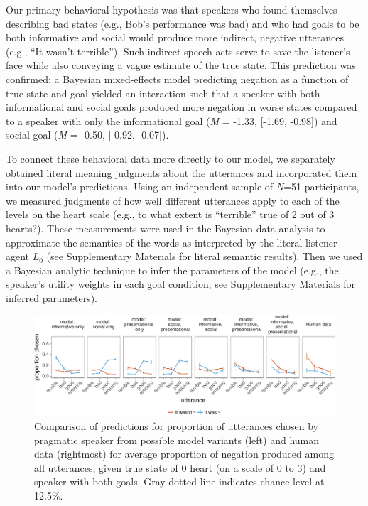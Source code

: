 \documentclass[12pt]{article}
\begin{document}
Our primary behavioral hypothesis was that speakers who found themselves
describing bad states (e.g., Bob's performance was bad) and who had
goals to be both informative and social would produce more indirect,
negative utterances (e.g., \enquote{It wasn't terrible}). Such indirect
speech acts serve to save the listener's face while also conveying a
vague estimate of the true state. This prediction was confirmed: a
Bayesian mixed-effects model predicting negation as a function of true
state and goal yielded an interaction such that a speaker with both
informational and social goals produced more negation in worse states
compared to a speaker with only the informational goal (\emph{M} =
-1.33, {[}-1.69, -0.98{]}) and social goal (\emph{M} = -0.50, {[}-0.92,
-0.07{]}).

To connect these behavioral data more directly to our model, we
separately obtained literal meaning judgments about the utterances and
incorporated them into our model's predictions. Using an independent
sample of \emph{N}=51 participants, we measured judgments of how well
different utterances apply to each of the levels on the heart scale
(e.g., to what extent is \enquote{terrible} true of 2 out of 3 hearts?).
These measurements were used in the Bayesian data analysis to
approximate the semantics of the words as interpreted by the literal
listener agent \(L_0\) (see Supplementary Materials for literal semantic
results). Then we used a Bayesian analytic technique \cite{lee2014} 
to infer the parameters of the model (e.g., the
speaker's utility weights in each goal condition; see Supplementary
Materials for inferred parameters).

\begin{figure}
\centering
\includegraphics[width=\textwidth]{polite_manuscript_files/figure-latex/comparison-1.pdf}
\caption{\label{fig:comparison}Comparison of predictions for proportion of
utterances chosen by pragmatic speaker from possible model variants
(left) and human data (rightmost) for average proportion of negation
produced among all utterances, given true state of 0 heart (on a scale
of 0 to 3) and speaker with both goals. Gray dotted line indicates
chance level at 12.5\%.}
\end{figure}
\end{document}

